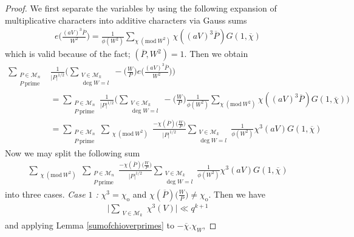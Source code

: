 \documentclass[12pt,reqno]{amsart}
\newcommand{\Mod}[1]{\ (\mathrm{mod}\ #1)}
\newcommand{\CM}{\mathcal{M}}
\begin{document}
\begin{proof}
We first separate the variables by using the following expansion of multiplicative characters into additive characters via Gauss sums
\begin{align*}
    e \Big ( \frac{(aV)^3\overline{P}}{W^2} \Big ) = \frac{1}{\phi(W^2)} \sum\limits_{\chi \Mod{ W^2}} \chi((aV)^3\overline{P}) G(1,\overline{\chi})
\end{align*}
which is valid because of the fact; $(\overline{P}, W^2)=1$. Then we obtain
\begin{align*}
    \sum_{\substack{P \in \CM_{n} \\ P \ \text{prime} }} & \frac{1}{|P|^{1/2}} \Big (\sum_{\substack{V \in \mathcal{M}_k \\ \deg W =l}} - \Big (\frac{W}{P} \Big ) e\Big ( \frac{(aV)^3\overline{P}}{W^2} \Big ) \Big) \\ & = \sum_{\substack{P \in \CM_{n} \\ P \ \text{prime}}} \frac{1}{|P|^{1/2}} \Big ( \sum_{\substack{V \in \mathcal{M}_k \\ \deg W =l}} - \Big (\frac{W}{P} \Big ) \frac{1}{\phi(W^2)} \sum\limits_{\chi \Mod{ W^2}} \chi((aV)^3\overline{P}) G(1,\overline{\chi}) \Big ) \\
    & = \sum_{\substack{P \in \CM_{n} \\ P \ \text{prime}}} \sum_{\substack{\chi \Mod{ W^2}}} \frac{-\chi(\overline{P}) \Big (\frac{W}{P} \Big )}{|P|^{1/2}} \sum_{\substack{V \in \mathcal{M}_k \\ \deg W =l}} \frac{1}{\phi(W^2)} \chi^3(a V) G(1,\overline{\chi})
\end{align*}
Now we may split the following sum
\begin{align*}
\sum_{\substack{\chi \Mod{ W^2}}} \sum_{\substack{ P \in \CM_{n} \\ P \ \text{prime}}} \frac{-\chi(\overline{P}) \Big (\frac{W}{P} \Big )}{|P|^{1/2}} \sum_{\substack{V \in \mathcal{M}_k \\ \deg W =l}} \frac{1}{\phi(W^2)} \chi^3(a V) G(1,\overline{\chi})
\end{align*}
into three cases.
\textit{Case $1$ :} $\chi^{3}=\chi_{\mathrm{o}}$ and $\chi(\overline{P}) \Big (\frac{W}{P} \Big ) \neq \chi_{\mathrm{o}}$. Then we have
\begin{align}\label{case1-1stbound}
    \Big | \sum_{\substack{V \in \mathcal{M}_k}} \chi^3(V) \Big | \ll q^{k + 1}
\end{align}
and applying Lemma \ref{sumofchioverprimes} to $-\overline{\chi}.\chi_{W}$,

\end{proof}
\end{document}

